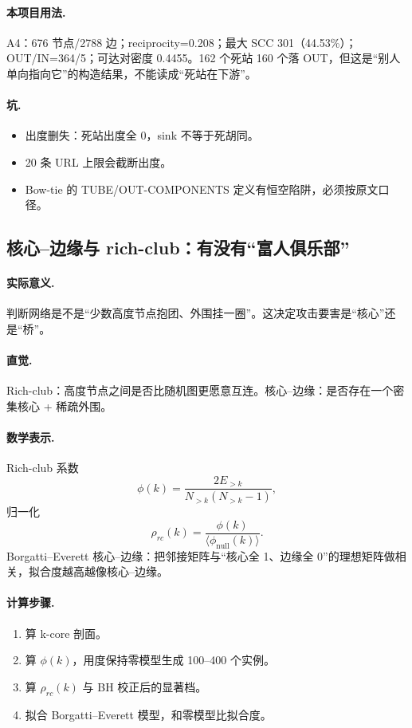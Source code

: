 \paragraph{本项目用法.}
\unit{A4}：676 节点/2788 边；reciprocity=0.208；最大 SCC 301（44.53\%）；OUT/IN=364/5；可达对密度 0.4455。162 个死站 160 个落 OUT，但这是“别人单向指向它”的构造结果，不能读成“死站在下游”。

\paragraph{坑.}
\begin{itemize}
  \item 出度删失：死站出度全 0，sink 不等于死胡同。
  \item 20 条 URL 上限会截断出度。
  \item Bow-tie 的 TUBE/OUT-COMPONENTS 定义有恒空陷阱，必须按原文口径。
\end{itemize}

\subsection{核心--边缘与 rich-club：有没有“富人俱乐部”}

\paragraph{实际意义.}
判断网络是不是“少数高度节点抱团、外围挂一圈”。这决定攻击要害是“核心”还是“桥”。

\paragraph{直觉.}
Rich-club：高度节点之间是否比随机图更愿意互连。核心--边缘：是否存在一个密集核心 + 稀疏外围。

\paragraph{数学表示.}
Rich-club 系数
\[
\phi(k)=\frac{2E_{>k}}{N_{>k}(N_{>k}-1)},
\]
归一化
\[
\rho_{rc}(k)=\frac{\phi(k)}{\langle\phi_{\mathrm{null}}(k)\rangle}.
\]
Borgatti--Everett 核心--边缘：把邻接矩阵与“核心全 1、边缘全 0”的理想矩阵做相关，拟合度越高越像核心--边缘。

\paragraph{计算步骤.}
\begin{enumerate}
  \item 算 k-core 剖面。
  \item 算 \(\phi(k)\)，用度保持零模型生成 100--400 个实例。
  \item 算 \(\rho_{rc}(k)\) 与 BH 校正后的显著档。
  \item 拟合 Borgatti--Everett 模型，和零模型比拟合度。
\end{enumerate}

